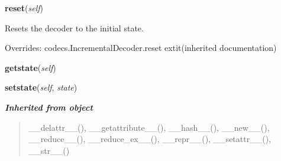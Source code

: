     \vspace{0.5ex}

\hspace{.8\funcindent}\begin{boxedminipage}{\funcwidth}

    \raggedright \textbf{reset}(\textit{self})

\setlength{\parskip}{2ex}
    Resets the decoder to the initial state.

\setlength{\parskip}{1ex}
      Overrides: codecs.IncrementalDecoder.reset 	extit{(inherited documentation)}

    \end{boxedminipage}

    \label{cssutils:codec:IncrementalDecoder:getstate}

    \vspace{0.5ex}

\hspace{.8\funcindent}\begin{boxedminipage}{\funcwidth}

    \raggedright \textbf{getstate}(\textit{self})

\setlength{\parskip}{2ex}
\setlength{\parskip}{1ex}
    \end{boxedminipage}

    \label{cssutils:codec:IncrementalDecoder:setstate}

    \vspace{0.5ex}

\hspace{.8\funcindent}\begin{boxedminipage}{\funcwidth}

    \raggedright \textbf{setstate}(\textit{self}, \textit{state})

\setlength{\parskip}{2ex}
\setlength{\parskip}{1ex}
    \end{boxedminipage}


\large{\textbf{\textit{Inherited from object}}}

\begin{quote}
\_\_delattr\_\_(), \_\_getattribute\_\_(), \_\_hash\_\_(), \_\_new\_\_(), \_\_reduce\_\_(), \_\_reduce\_ex\_\_(), \_\_repr\_\_(), \_\_setattr\_\_(), \_\_str\_\_()
\end{quote}

